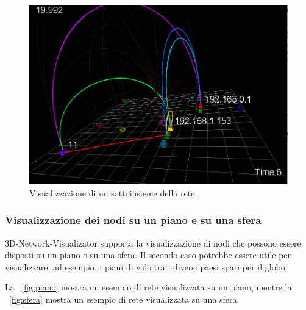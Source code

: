 \documentclass[a4paper,12pt]{article}
\begin{document}

\begin{figure}[htb!]
 \begin{center}
  \includegraphics[width=\textwidth]{images/image3.png}
 \end{center}
 \caption{Visualizzazione di un sottoinsieme della rete.}
 \label{fig:sottoinsieme}
\end{figure}
 
 
\subsubsection{Visualizzazione dei nodi su un piano e su una sfera}
3D-Network-Visualizator supporta la visualizzazione di nodi che possono essere disposti su un piano o su una sfera. Il secondo caso potrebbe essere utile per visualizzare, ad esempio, i piani di volo tra i diversi paesi spari per il globo.

La \figurename~\ref{fig:piano} mostra un esempio di rete visualizzata su un piano, mentre la \figurename~\ref{fig:sfera} mostra un esempio di rete visualizzata su una sfera.
\end{document}
